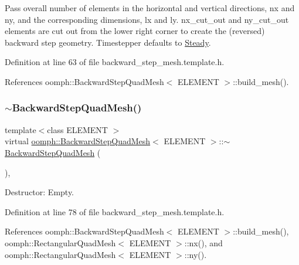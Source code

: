 Pass overall number of elements in the horizontal and vertical directions, nx and ny, and the corresponding dimensions, lx and ly. nx\+\_\+cut\+\_\+out and ny\+\_\+cut\+\_\+out elements are cut out from the lower right corner to create the (reversed) backward step geometry. Timestepper defaults to \hyperlink{classoomph_1_1Steady}{Steady}. 



Definition at line 63 of file backward\+\_\+step\+\_\+mesh.\+template.\+h.



References oomph\+::\+Backward\+Step\+Quad\+Mesh$<$ E\+L\+E\+M\+E\+N\+T $>$\+::build\+\_\+mesh().

\mbox{\label{classoomph_1_1BackwardStepQuadMesh_aec4e05ad80d83327050653ebabce9564}} 
\subsubsection{\texorpdfstring{$\sim$\+Backward\+Step\+Quad\+Mesh()}{~BackwardStepQuadMesh()}}
{\footnotesize\ttfamily template$<$class E\+L\+E\+M\+E\+NT $>$ \\
virtual \hyperlink{classoomph_1_1BackwardStepQuadMesh}{oomph\+::\+Backward\+Step\+Quad\+Mesh}$<$ E\+L\+E\+M\+E\+NT $>$\+::$\sim$\hyperlink{classoomph_1_1BackwardStepQuadMesh}{Backward\+Step\+Quad\+Mesh} (\begin{DoxyParamCaption}{ }\end{DoxyParamCaption})\hspace{0.3cm}{\ttfamily [inline]}, {\ttfamily [virtual]}}



Destructor\+: Empty. 



Definition at line 78 of file backward\+\_\+step\+\_\+mesh.\+template.\+h.



References oomph\+::\+Backward\+Step\+Quad\+Mesh$<$ E\+L\+E\+M\+E\+N\+T $>$\+::build\+\_\+mesh(), oomph\+::\+Rectangular\+Quad\+Mesh$<$ E\+L\+E\+M\+E\+N\+T $>$\+::nx(), and oomph\+::\+Rectangular\+Quad\+Mesh$<$ E\+L\+E\+M\+E\+N\+T $>$\+::ny().




